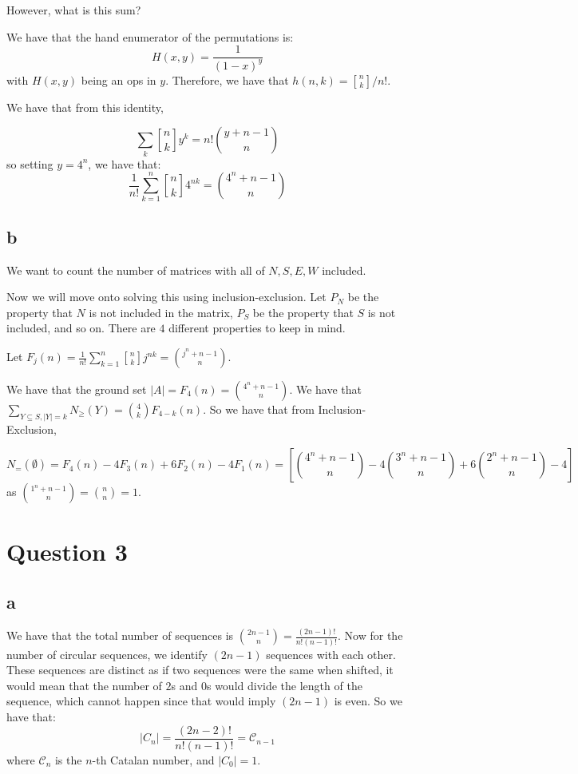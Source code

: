 \documentclass[]{article}
\theoremstyle{definition}
\numberwithin{theorem}{section}
\numberwithin{equation}{section}
\newcommand{\genstirlingI}[3]{%
	\genfrac{[}{]}{0pt}{#1}{#2}{#3}%
}
\newcommand{\stirlingI}[2]{\genstirlingI{}{#1}{#2}}
\begin{document}
However, what is this sum?

We have that the hand enumerator of the permutations is:
\begin{equation}
	H(x, y) = \frac{1}{(1 - x)^y}
\end{equation}
with $H(x, y)$ being an ops in $y$. Therefore, we have that $h(n, k) = \stirlingI{n}{k}/ n!$. 

We have that from this identity,

\begin{equation}
	\sum_k \stirlingI{n}{k} y^k = n! \binom{y + n - 1}{n}
\end{equation}
so setting $y = 4^n$, we have that:
\begin{equation}
	\frac{1}{n!} \sum_{k = 1}^n \stirlingI{n}{k} 4^{n k} = \binom{4^n + n - 1}{n}
\end{equation}

\subsection{b}
We want to count the number of matrices with all of $N, S, E, W$ included. 

Now we will move onto solving this using inclusion-exclusion.
Let $P_N$ be the property that $N$ is not included in the matrix, $P_S$ be the property that $S$ is not included, and so on. There are $4$ different properties to keep in mind.
\par
Let $F_j(n) = \frac{1}{n!} \sum_{k = 1}^n \stirlingI{n}{k} j^{n k} = \binom{j^n + n - 1}{n}$. 

We have that the ground set $|A| = F_4(n) = \binom{4^n + n - 1}{n}$.
We have that $\sum_{Y \subseteq S, |Y| = k} N_\geq(Y) = \binom{4}{k} F_{4 - k}(n)$. 
So we have that from Inclusion-Exclusion,

\begin{equation}
	N_{=}(\emptyset) = F_{4}(n) - 4 F_{3}(n) + 6 F_{2}(n) - 4 F_{1}(n) = \left[ \binom{4^n + n - 1}{n} - 4 \binom{3^n + n - 1}{n} + 6 \binom{2^n + n - 1}{n} - 4 \right]
\end{equation}
as $\binom{1^n + n - 1}{n} = \binom{n}{n} = 1$. 

\section{Question 3}
\subsection{a}
We have that the total number of sequences is $\binom{2n-1}{n}= \frac{(2n -1 )!}{n! (n - 1)!}$. Now for the number of circular sequences, we identify $(2n - 1)$ sequences with each other. These sequences are distinct as if two sequences were the same when shifted, it would mean that the number of $2$s and $0$s would divide the length of the sequence, which cannot happen since that would imply $(2n-1)$ is even. So we have that:
\begin{equation}
	|C_n| = \frac{(2n - 2)!}{n!(n - 1)!} = \mathcal{C}_{n - 1}
\end{equation}
where $\mathcal{C}_{n}$ is the $n$-th Catalan number, and $|C_0| = 1$. 
\end{document}

